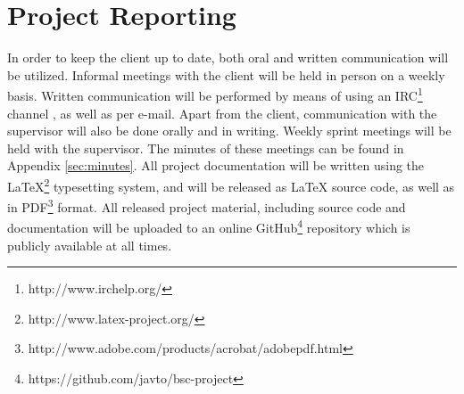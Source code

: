 \section{Project Reporting}
\label{sec:proj_rep}
In order to keep the client up to date, both oral and written communication will be utilized. Informal meetings with the client will be held in person on a weekly basis. Written communication will be performed by means of using an IRC\footnote{http://www.irchelp.org/} channel , as well as per e-mail. Apart from the client, communication with the supervisor will also be done orally and in writing. Weekly sprint meetings will be held with the supervisor. The minutes of these meetings can be found in Appendix \ref{sec:minutes}. All project documentation will be written using the LaTeX\footnote{http://www.latex-project.org/} typesetting system, and will be released as LaTeX source code, as well as in PDF\footnote{http://www.adobe.com/products/acrobat/adobepdf.html} format. All released project material, including source code and documentation will be uploaded to an online GitHub\footnote{https://github.com/javto/bsc-project} repository which is publicly available at all times.